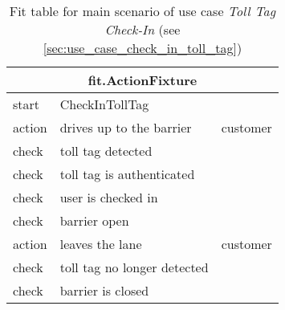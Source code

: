 
\begin{table}
\begin{centering}
\begin{tabular}{|l|l|l|}
\hline 
\multicolumn{3}{|c|}{fit.ActionFixture} \tabularnewline
\hline 
start & CheckInTollTag & \tabularnewline
\hline 
action & drives up to the barrier & customer \tabularnewline
\hline 
check & toll tag detected & \tabularnewline
\hline 
check & toll tag is authenticated & \tabularnewline
\hline 
check & user is checked in & \tabularnewline
\hline 
check & barrier open & \tabularnewline
\hline 
action & leaves the lane & customer \tabularnewline
\hline 
check & toll tag no longer detected & \tabularnewline
\hline 
check & barrier is closed & \tabularnewline
\hline 
\end{tabular}
\par\end{centering}

\caption{Fit table for main scenario of use case \emph{Toll Tag Check-In} (see \autoref{sec:use_case_check_in_toll_tag})}
\end{table}


